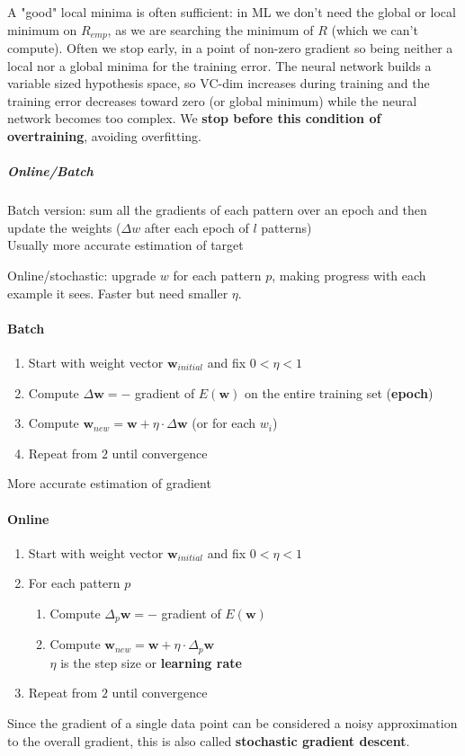 \documentclass[10pt]{report}
\begin{document}
A "good" local minima is often sufficient: in ML we don't need the global or local minimum on $R_{emp}$, as we are searching the minimum of $R$ (which we can't compute). Often we stop early, in a point of non-zero gradient so being neither a local nor a global minima for the training error. The neural network builds a variable sized hypothesis space, so VC-dim increases during training and the training error decreases toward zero (or global minimum) while the neural network becomes too complex. We \textbf{stop before this condition of overtraining}, avoiding overfitting.
\subparagraph{Online/Batch} 
\begin{list}{}{}
	\item Batch version: sum all the gradients of each pattern over an epoch and then update the weights ($\Delta w$ after each epoch of $l$ patterns)\\
	Usually more accurate estimation of target
	\item Online/stochastic: upgrade $w$ for each pattern $p$, making progress with each example it sees. Faster but need smaller $\eta$.
\end{list}
\begin{multicols}{2}
\paragraph{Batch}
\begin{enumerate}
	\item Start with weight vector $\mathbf{w}_{initial}$ and fix $0 < \eta < 1$
	\item Compute $\Delta \mathbf{w} = -$ gradient of $E(\mathbf{w})$ on the entire training set (\textbf{epoch})
	\item Compute $\mathbf{w}_{new} = \mathbf{w} + \eta\cdot\Delta \mathbf{w}$ (or for each $w_i$)
	\item Repeat from $2$ until convergence
\end{enumerate}
More accurate estimation of gradient
\columnbreak
\paragraph{Online}
\begin{enumerate}
	\item Start with weight vector $\mathbf{w}_{initial}$ and fix $0 < \eta < 1$
	\item For each pattern $p$\begin{enumerate}
		\item Compute $\Delta_p \mathbf{w} = -$ gradient of $E(\mathbf{w})$
		\item Compute $\mathbf{w}_{new} = \mathbf{w} + \eta\cdot\Delta_p \mathbf{w}$\\
	$\eta$ is the step size or \textbf{learning rate}
	\end{enumerate}
	\item Repeat from $2$ until convergence
\end{enumerate}
Since the gradient of a single data point can be considered a noisy approximation to the overall gradient, this is also called \textbf{stochastic gradient descent}.
\end{multicols}
\end{document}
